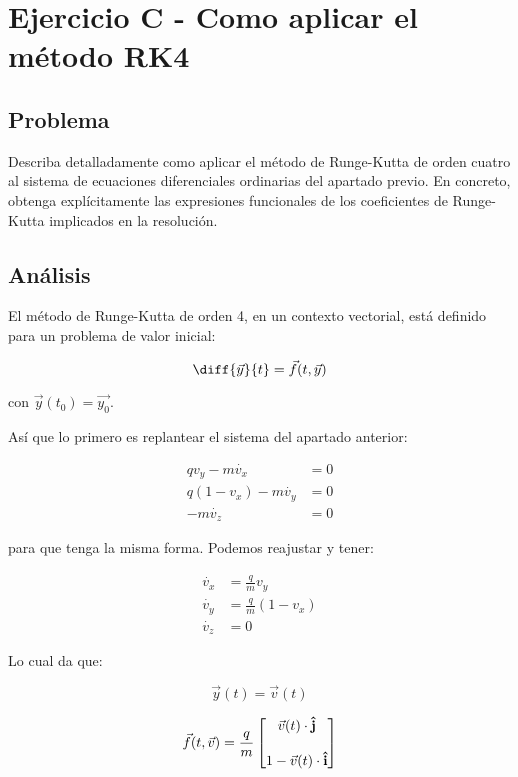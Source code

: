 \section{Ejercicio C - Como aplicar el método RK4}

\subsection{Problema}

Describa detalladamente como aplicar el método de Runge-Kutta de orden cuatro al sistema de ecuaciones diferenciales ordinarias del apartado previo. En concreto, obtenga explícitamente las expresiones funcionales de los coeficientes de Runge-Kutta implicados en la resolución.

\subsection{Análisis}

El método de Runge-Kutta de orden 4, en un contexto vectorial, está definido para un problema de valor inicial:

$$
\diff{\vec{y}}{t} = \vec{f}(t, \vec{y})
$$

con $\vec{y}(t_0) = \vec{y_0}$. 

Así que lo primero es replantear el sistema del apartado anterior: 


\begin{align*}
	q v_y - m \dot{v_x} &= 0 \\
	q(1 - v_x) - m \dot{v_y} &= 0 \\
	-m \dot{v_z} &= 0
\end{align*}

para que tenga la misma forma. Podemos reajustar y tener:

\begin{align*}
	\dot{v_x} &= \frac{q}{m} v_y \\
	\dot{v_y} &= \frac{q}{m}(1 - v_x) \\
	\dot{v_z} &= 0
\end{align*}

Lo cual da que:

$$
\vec{y}(t) = \vec{v}(t)
$$

\begin{equation}\label{eq:vel_deriv}
\vec{f}(t, \vec{v}) = \frac{q}{m} \begin{bmatrix}
\vec{v}(t) \cdot \boldsymbol{\hat{\textbf{j}}} \\ \\
1-\vec{v}(t) \cdot \boldsymbol{\hat{\textbf{i}}}\end{bmatrix}
\end{equation}

